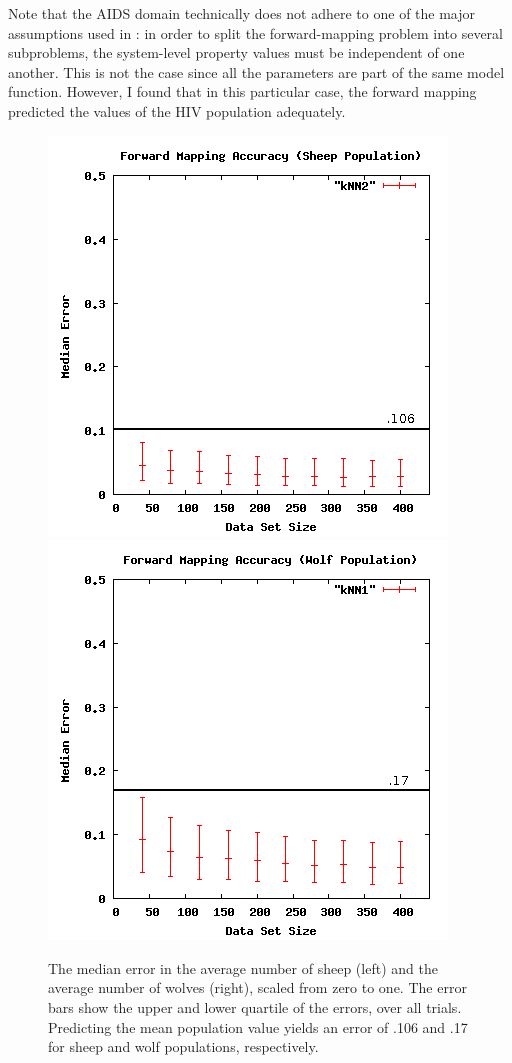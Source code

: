 Note that the AIDS domain technically does not adhere to one of the major assumptions used in \fw: in order to split the forward-mapping problem into several subproblems, the system-level property values must be independent of one another.
This is not the case since all the parameters are part of the same model function.
However, I found that in this particular case, the forward mapping predicted the values of the HIV population adequately.


\begin{figure}[ht]
\centering
\includegraphics[scale=.4]{images/results_wolfsheep/fm-sheep-pop.png}
\includegraphics[scale=.4]{images/results_wolfsheep/fm-wolf-pop.png}
\caption{The median error in the average number of sheep (left) and the average number of wolves (right), scaled from zero to one.
The error bars show the upper and lower quartile of the errors, over all trials.
Predicting the mean population value yields an error of .106 and .17 for sheep and wolf populations, respectively.}
\label{fig:wolfsheeppop}
\end{figure}

